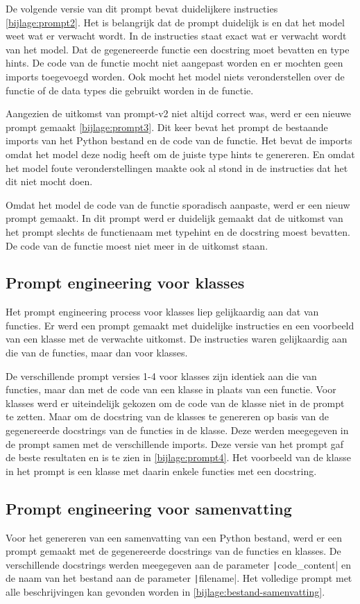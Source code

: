 De volgende versie van dit prompt bevat duidelijkere instructies \ref{bijlage:prompt2}.
Het is belangrijk dat de prompt duidelijk is en dat het model weet wat er verwacht wordt. 
In de instructies staat exact wat er verwacht wordt van het model. Dat de gegenereerde functie een docstring moet bevatten en type hints.
De code van de functie mocht niet aangepast worden en er mochten geen imports toegevoegd worden.
Ook mocht het model niets veronderstellen over de functie of de data types die gebruikt worden in de functie.

Aangezien de uitkomst van prompt-v2 niet altijd correct was, werd er een nieuwe prompt gemaakt \ref{bijlage:prompt3}.
Dit keer bevat het prompt de bestaande imports van het Python bestand en de code van de functie.
Het bevat de imports omdat het model deze nodig heeft om de juiste type hints te genereren.
En omdat het model foute veronderstellingen maakte ook al stond in de instructies dat het dit niet mocht doen.

Omdat het model de code van de functie sporadisch aanpaste, werd er een nieuw prompt gemaakt.
In dit prompt werd er duidelijk gemaakt dat de uitkomst van het prompt slechts de functienaam met typehint en de docstring moest bevatten.
De code van de functie moest niet meer in de uitkomst staan.

\subsection{Prompt engineering voor klasses}
Het prompt engineering process voor klasses liep gelijkaardig aan dat van functies.
Er werd een prompt gemaakt met duidelijke instructies en een voorbeeld van een klasse met de verwachte uitkomst.
De instructies waren gelijkaardig aan die van de functies, maar dan voor klasses.

De verschillende prompt versies 1-4 voor klasses zijn identiek aan die van functies, maar dan met de code van een klasse in plaats van een functie.
Voor klasses werd er uiteindelijk gekozen om de code van de klasse niet in de prompt te zetten.
Maar om de docstring van de klasses te genereren op basis van de gegenereerde docstrings van de functies in de klasse.
Deze werden meegegeven in de prompt samen met de verschillende imports.
Deze versie van het prompt gaf de beste resultaten en is te zien in \ref{bijlage:prompt4}.
Het voorbeeld van de klasse in het prompt is een klasse met daarin enkele functies met een docstring.

\subsection{Prompt engineering voor samenvatting}
Voor het genereren van een samenvatting van een Python bestand, werd er een prompt gemaakt met de gegenereerde docstrings van de functies en klasses.
De verschillende docstrings werden meegegeven aan de parameter \texttt|code_content| en de naam van het bestand aan de parameter 
\texttt|filename|.
Het volledige prompt met alle beschrijvingen kan gevonden worden in \ref{bijlage:bestand-samenvatting}.


